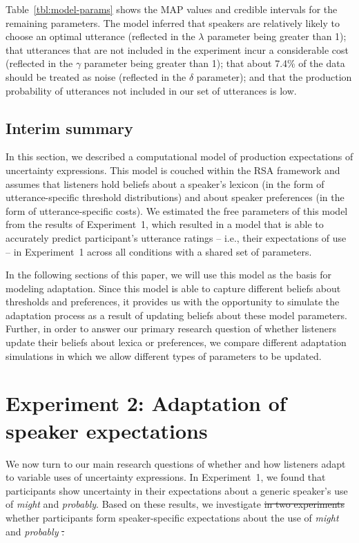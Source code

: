 \documentclass[man, floatsintext]{apa6}
\newcommand{\tableref}[1]{Table~\ref{#1}}
\providecommand{\DIFdel}[1]{{\protect\color{red}\sout{#1}}}                      %
\providecommand{\DIFdelbegin}{} %
\providecommand{\DIFdelend}{} %
\newcommand{\DIFscaledelfig}{0.5}
\newlength{\DIFdelgraphicswidth} %
\newlength{\DIFdelgraphicsheight} %
\newcommand{\DIFdelincludegraphics}[2][]{%
\sbox{\DIFdelgraphicsbox}{\DIFOincludegraphics[#1]{#2}}%
\settoboxwidth{\DIFdelgraphicswidth}{\DIFdelgraphicsbox} %
\settoboxtotalheight{\DIFdelgraphicsheight}{\DIFdelgraphicsbox} %
\scalebox{\DIFscaledelfig}{%
\parbox[b]{\DIFdelgraphicswidth}{\usebox{\DIFdelgraphicsbox}\\[-\baselineskip] \rule{\DIFdelgraphicswidth}{0em}}\llap{\resizebox{\DIFdelgraphicswidth}{\DIFdelgraphicsheight}{%
\setlength{\unitlength}{\DIFdelgraphicswidth}%
\begin{picture}(1,1)%
\thicklines\linethickness{2pt} %
{\color[rgb]{1,0,0}\put(0,0){\framebox(1,1){}}}%
{\color[rgb]{1,0,0}\put(0,0){\line( 1,1){1}}}%
{\color[rgb]{1,0,0}\put(0,1){\line(1,-1){1}}}%
\end{picture}%
}\hspace*{3pt}}} %
} %
\DeclareRobustCommand{\DIFdelbegin}{\DIFOdelbegin \let\includegraphics\DIFdelincludegraphics} %
\DeclareRobustCommand{\DIFdelend}{\DIFOaddend \let\includegraphics\DIFOincludegraphics} %
\begin{document}
  \tableref{tbl:model-params} shows the MAP values and credible intervals for the remaining parameters. The model inferred that speakers
  are relatively likely to choose an optimal utterance (reflected in the $\lambda$ parameter being
  greater than 1); that utterances that are not included in the experiment incur a considerable cost  (reflected in the $\gamma$ parameter being greater than 1); that about 7.4\%
  of the data should be treated as noise (reflected in the $\delta$ parameter); and that the production probability of utterances not included in our set of utterances is low. 

 
 \subsection{Interim summary}

 In this section, we described a computational model of production expectations of uncertainty expressions. This model
 is couched within the RSA framework and assumes that listeners hold beliefs about a speaker's lexicon (in the form
 of utterance-specific threshold distributions) and about speaker preferences (in the form of utterance-specific costs). We estimated 
 the free parameters of this model from the results of Experiment~1, which resulted in a model that is able to accurately predict
 participant's utterance ratings -- i.e., their expectations of use --  in Experiment~1 across all conditions with a shared set of parameters.

 In the following sections of this paper, we will use this model as the basis for modeling adaptation. Since this model
 is able to capture different beliefs about thresholds and preferences, it provides us with the opportunity to simulate 
 the adaptation process as a result of updating beliefs about these model parameters. Further, in order to answer
 our primary research question of whether listeners update their beliefs about lexica or preferences, we compare
 different adaptation simulations in which we allow different types of parameters to be updated.





\section{Experiment 2: Adaptation of speaker expectations}
\label{sec:exp-prod-adaptation}

We now turn to our main research questions of whether and how listeners adapt to variable uses of uncertainty expressions.
In Experiment~1, we found that participants show uncertainty in their expectations about a generic speaker's 
use of \textit{might} and \textit{probably}. Based on these results, we investigate \DIFdelbegin \DIFdel{in two experiments }\DIFdelend whether participants
form speaker-specific expectations about the use of \textit{might} and \textit{probably} \DIFdelbegin \DIFdel{.
}%
\end{document}
